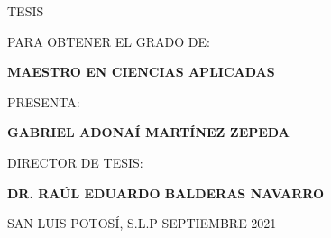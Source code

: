 \begin{titlepage}
\begin{center}
		\vspace{0.8cm}
		TESIS
		\vspace{0.5cm}
		
		PARA OBTENER EL GRADO DE:
		
		\vspace{0.5cm}
		\large
		\textbf{MAESTRO EN CIENCIAS APLICADAS}
		\vspace{0.8cm}
		
		PRESENTA:
		\vspace{0.5cm}
		
		\textbf{GABRIEL ADONA\'I MART\'INEZ ZEPEDA}
		
		\vspace{0.5cm}
		DIRECTOR DE TESIS:
		
		\vspace{0.5cm}
		\textbf{DR. RA\'UL EDUARDO BALDERAS NAVARRO}
		
		\vspace{0.8cm}
		SAN LUIS POTOS\'I, S.L.P \hspace{4cm} SEPTIEMBRE 2021
	\end{center}
\vspace{0.8cm}

\end{titlepage}